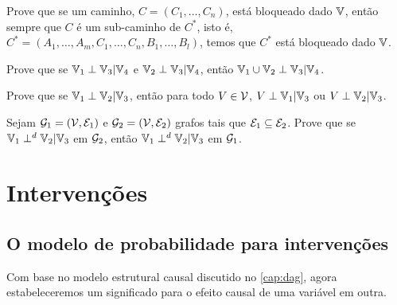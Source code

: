 \begin{exercise}
 Prove que se um caminho,
 $C = (C_1, \ldots, C_n)$, está bloqueado
 dado ${\mathbb V}$, então sempre que $C$ é um sub-caminho de $C^*$,
 isto é, $C^* = (A_1, \ldots, A_m, C_1, \ldots, C_n, B_1, \ldots, B_l)$,
 temos que $C^*$ está bloqueado dado ${\mathbb V}$.
\end{exercise}

\begin{exercise}
 Prove que se ${\mathbb V}_1 \perp {\mathbb V}_3 | {\mathbb V}_4$ e
 ${\mathbb V}_2 \perp {\mathbb V}_3 | {\mathbb V}_4$, então
 ${\mathbb V}_1 \cup {\mathbb V}_2 \perp {\mathbb V}_3 | {\mathbb V}_4$.
\end{exercise}

\begin{exercise}
 Prove que se ${\mathbb V}_1 \perp {\mathbb V}_2 | {\mathbb V}_3$, então
 para todo $V \in {\mathcal V}$, 
 $V \perp {\mathbb V}_1 | {\mathbb V}_3$ ou
 $V \perp {\mathbb V}_2 | {\mathbb V}_3$.
\end{exercise}

\begin{exercise}
 \label{lemma:dsep_monotone}
 Sejam ${\mathcal G}_1 = ({\mathcal V}, {\mathcal E}_1)$ e
 ${\mathcal G}_2 = ({\mathcal V}, {\mathcal E}_2)$ grafos
 tais que ${\mathcal E}_1 \subseteq {\mathcal E}_2$.
 Prove que se ${\mathbb V}_1 \perp^d {\mathbb V}_2 | {\mathbb V}_3$ em ${\mathcal G}_2$, então
 ${\mathbb V}_1 \perp^d {\mathbb V}_2 | {\mathbb V}_3$ em ${\mathcal G}_1$.
\end{exercise}

\chapter{Intervenções}
\label{cap:intervencao}


\section{O modelo de probabilidade para intervenções}

Com base no modelo estrutural causal discutido 
no \cref{cap:dag}, agora estabeleceremos
um significado para o efeito causal
de uma variável em outra.

